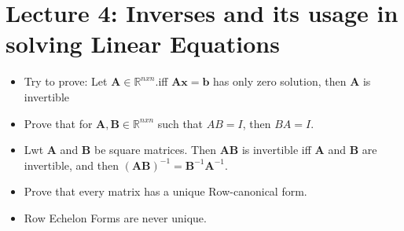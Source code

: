 \documentclass{article}
\begin{document}
\section {Lecture 4: Inverses and its usage in solving Linear Equations}
\begin{itemize}
  \item Try to prove: Let $\mathbf{A} \in \mathbb{R}^{nxn}.$iff $\mathbf{Ax = b}$ has only zero solution, then $\mathbf{A}$ is invertible
  \item Prove that for $\mathbf{A, B} \in \mathbb{R}^{nxn}$ such that $AB = I$, then $BA = I$.
  \item Lwt \textbf{A} and \textbf{B} be square matrices. Then \textbf{AB} is invertible iff \textbf{A} and \textbf{B} are invertible, and then $\mathbf{(AB)}^{-1} = \mathbf{B}^{-1}\mathbf{A}^{-1}.$

  \item Prove that every matrix has a unique Row-canonical form.
  \item Row Echelon Forms are never unique.

\end{itemize}
\end{document}
